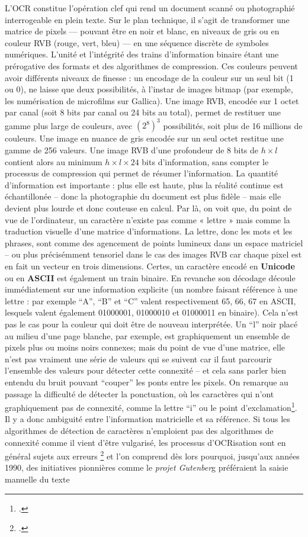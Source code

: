 L’OCR constitue l’opération clef qui rend un document scanné ou photographié interrogeable en plein texte. Sur le plan technique, il s’agit de transformer une matrice de pixels — pouvant être en noir et blanc, en niveaux de gris ou en couleur RVB (rouge, vert, bleu) — en une séquence discrète de symboles numériques. L'unité et l'intégrité des trains d'information binaire étant une prérogative des formats et des algorithmes de compression. Ces couleurs peuvent avoir différents niveaux de finesse : un encodage de la couleur sur un seul bit (1 ou 0), ne laisse que deux possibilités, à l'instar de images bitmap (par exemple, les numérisation de microfilms sur Gallica). Une image RVB, encodée sur 1 octet par canal (soit 8 bits par canal ou 24 bits au total), permet de restituer une gamme plus large de couleurs, avec $(2^8)^3$ possibilités, soit plus de 16 millions de couleurs. Une image en nuance de gris encodée sur un seul octet restitue une gamme de 256 valeurs. Une image RVB d'une profondeur de 8 bits de $h \times l$ contient alors au minimum $h \times l \times 24$ bits d'information, sans compter le processus de compression qui permet de résumer l'information. La quantité d'information est importante : plus elle est haute, plus la réalité continue est échantillonée -- donc la photographie du document est plus fidèle -- mais elle devient plus lourde et donc couteuse en calcul. Par là, on voit que, du point de vue de l’ordinateur, un caractère n’existe pas comme « lettre » mais comme la traduction visuelle d'une matrice d'informations. La lettre, donc les mots et les phrases, sont comme des agencement de points lumineux dans un espace matriciel -- ou plus précisémment tensoriel dans le cas des images RVB car chaque pixel est en fait un vecteur en trois dimensions. Certes, un caractère encodé en \textbf{Unicode} ou en \textbf{ASCII} est également un train binaire. En revanche son décodage découle immédiatement sur une information explicite (un nombre faisant référence à une lettre : par exemple \enquote{A}, \enquote{B} et \enquote{C} valent respectivement 65, 66, 67 en ASCII, lesquels valent également 01000001, 01000010 et 01000011 en binaire). Cela n'est pas le cas pour la couleur qui doit être de nouveau interprétée. Un \enquote{l} noir placé au milieu d'une page blanche, par exemple, est graphiquement un ensemble de pixels plus ou moins noirs connexes; mais du point de vue d'une matrice, elle n'est pas vraiment une série de valeurs qui se suivent car il faut parcourir l'ensemble des valeurs pour détecter cette connexité -- et cela sans parler bien entendu du bruit pouvant \enquote{couper} les ponts entre les pixels. On remarque au passage la difficulté de détecter la ponctuation, où les caractères qui n'ont graphiquement pas de connexité, comme la lettre \enquote{i} ou le point d'exclamation\footcite[][]{lecolinet}. Il y a donc ambiguité entre l'information matricielle et sa référence. Si tous les algorithmes de détection de caractères n'emploient pas des algorithmes de connexité comme il vient d'être vulgarisé, les processus d'OCRisation sont en général sujets aux erreurs \footcite[][]{chiron} et l’on comprend dès lors pourquoi, jusqu’aux années 1990, des initiatives pionnières comme le \emph{projet Gutenber}g préféraient la saisie manuelle du texte 